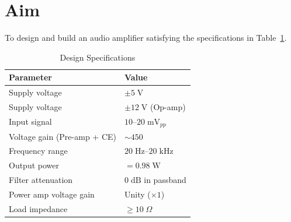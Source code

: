 \documentclass[10pt,twocolumn]{article}
\begin{document}

\section{Aim}
To design and build an audio amplifier satisfying the specifications in Table~\ref{tab:specs}.

\begin{table}[H]
\centering
\caption{Design Specifications}
\label{tab:specs}
\small
\begin{tabularx}{\linewidth}{lX}
\toprule
\textbf{Parameter}          & \textbf{Value} \\
\midrule
Supply voltage              & $\pm 5\;\text{V}$ \\
Supply voltage              & $\pm 12\;\text{V}$ (Op-amp) \\
Input signal                & $10$--$20\;\text{mV}_{pp}$ \\
Voltage gain (Pre-amp + CE) & $ \sim 450 $ \\
Frequency range             & $20\;\text{Hz}$--$20\;\text{kHz}$ \\
Output power                & $= 0.98 \;\text{W}$ \\
Filter attenuation          & $0\;\text{dB}$ in passband \\
Power amp voltage gain      & Unity ($\times 1$) \\
Load impedance              & $\geq 10\;\Omega$ \\
\bottomrule
\end{tabularx}
\end{table}
\end{document}
